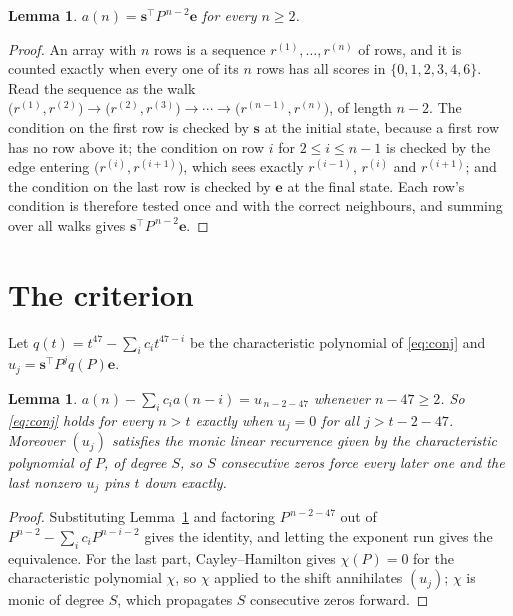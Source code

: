 \documentclass[11pt,a4paper]{article}
\theoremstyle{plain}
\newtheorem{lemma}[theorem]{Lemma}
\theoremstyle{definition}
\begin{document}
\begin{lemma}\label{lem:walk}
$a(n)=\mathbf{s}^{\!\top}P^{\,n-2}\mathbf{e}$ for every $n\ge2$.
\end{lemma}

\begin{proof}
An array with $n$ rows is a sequence $r^{(1)},\dots,r^{(n)}$ of rows, and it is counted
exactly when every one of its $n$ rows has all scores in $\{0,1,2,3,4,6\}$. Read the sequence as the
walk $\bigl(r^{(1)},r^{(2)}\bigr)\to\bigl(r^{(2)},r^{(3)}\bigr)\to\cdots\to
\bigl(r^{(n-1)},r^{(n)}\bigr)$, of length $n-2$. The condition on the first row is
checked by $\mathbf{s}$ at the initial state, because a first row has no row above it; the
condition on row $i$ for $2\le i\le n-1$ is checked by the edge entering
$\bigl(r^{(i)},r^{(i+1)}\bigr)$, which sees exactly $r^{(i-1)}$, $r^{(i)}$ and
$r^{(i+1)}$; and the condition on the last row is checked by $\mathbf{e}$ at the final
state. Each row's condition is therefore tested once and with the correct neighbours, and
summing over all walks gives $\mathbf{s}^{\!\top}P^{\,n-2}\mathbf{e}$.
\end{proof}

\section{The criterion}

Let $q(t)=t^{47}-\sum_i c_i t^{47-i}$ be the characteristic polynomial of
\eqref{eq:conj} and $u_j=\mathbf{s}^{\!\top}P^{j}q(P)\mathbf{e}$.

\begin{lemma}\label{lem:crit}
$a(n)-\sum_i c_i a(n-i)=u_{\,n-2-47}$ whenever $n-47\ge2$. So \eqref{eq:conj}
holds for every $n>t$ exactly when $u_j=0$ for all $j>t-2-47$. Moreover $(u_j)$
satisfies the monic linear recurrence given by the characteristic polynomial of $P$, of
degree $S$, so $S$ consecutive zeros force every later one and the last nonzero $u_j$ pins
$t$ down exactly.
\end{lemma}

\begin{proof}
Substituting Lemma~\ref{lem:walk} and factoring $P^{\,n-2-47}$ out of
$P^{n-2}-\sum_i c_i P^{n-i-2}$ gives the identity, and letting the exponent run gives the
equivalence. For the last part, Cayley--Hamilton gives $\chi(P)=0$ for the characteristic
polynomial $\chi$, so $\chi$ applied to the shift annihilates $(u_j)$; $\chi$ is monic of
degree $S$, which propagates $S$ consecutive zeros forward.
\end{proof}
\end{document}
